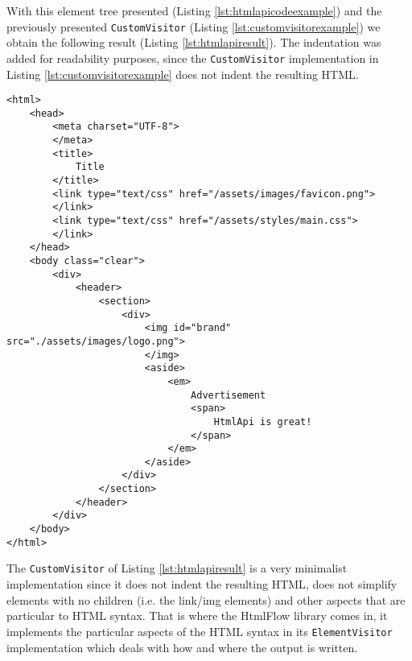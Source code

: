 \noindent
With this element tree presented (Listing \ref{lst:htmlapicodeexample}) and the previously presented \texttt{CustomVisitor} (Listing \ref{lst:customvisitorexample}) we obtain the following result (Listing \ref{lst:htmlapiresult}). The indentation was added for readability purposes, since the \texttt{CustomVisitor} implementation in Listing \ref{lst:customvisitorexample} does not indent the resulting \ac{HTML}.

\bigskip


\begin{minipage}{\linewidth}
\begin{lstlisting}[caption={HtmlApi Visitor Result},label={lst:htmlapiresult}]
<html>
    <head>
        <meta charset="UTF-8">
        </meta>
        <title>
            Title
        </title>
        <link type="text/css" href="/assets/images/favicon.png">
        </link>
        <link type="text/css" href="/assets/styles/main.css">
        </link>
    </head>
    <body class="clear">
        <div>
            <header>
                <section>
                    <div>
                        <img id="brand" src="./assets/images/logo.png">
                        </img>
                        <aside>
                            <em>
                                Advertisement
                                <span>
                                    HtmlApi is great!
                                </span>
                            </em>
                        </aside>
                    </div>
                </section>
            </header>
        </div>
    </body>
</html>                          
\end{lstlisting}
\end{minipage}

\noindent
The \texttt{CustomVisitor} of Listing \ref{lst:htmlapiresult} is a very minimalist implementation since it does not indent the resulting \ac{HTML}, does not simplify elements with no children (i.e. the link/img elements) and other aspects that are particular to \ac{HTML} syntax. That is where the HtmlFlow library comes in, it implements the particular aspects of the \ac{HTML} syntax in its \texttt{ElementVisitor} implementation which deals with how and where the output is written.